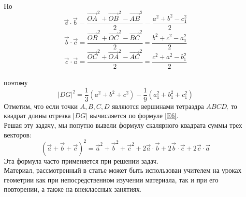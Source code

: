 \documentclass{article}
\begin{document}
\\Но
$$\overrightarrow{a}\cdot\overrightarrow{b}=\frac{\overrightarrow{OA}^2+\overrightarrow{OB}^2-\overrightarrow{AB}^2}{2}=\frac{a^2+b^2-c_1^2}{2}$$
$$\overrightarrow{b}\cdot\overrightarrow{c}=\frac{\overrightarrow{OB}^2+\overrightarrow{OC}^2-\overrightarrow{BC}^2}{2}=\frac{b^2+c^2-a_1^2}{2}$$
$$\overrightarrow{c}\cdot\overrightarrow{a}=\frac{\overrightarrow{OC}^2+\overrightarrow{OA}^2-\overrightarrow{AC}^2}{2}=\frac{c^2+a^2-b_1^2}{2}$$
\\поэтому
\begin{equation}\label{E6}
|DG|^2=\frac{1}{3}(a^2+b^2+c^2)-\frac{1}{9}(a_1^2+b_1^2+c_1^2)
\end{equation}
Отметим, что если точки $A,B,C,D$ являются вершинами тетраэдра $ABCD$, то квадрат длины отрезка $|DG|$ вычисляется по формуле \eqref{E6}.
\\Решая эту задачу, мы попутно вывели формулу скалярного квадрата суммы трех векторов:
$$(\overrightarrow{a}+\overrightarrow{b}+\overrightarrow{c})^2=\overrightarrow{a}^2+\overrightarrow{b}^2+\overrightarrow{c}^2+2\overrightarrow{a}\cdot\overrightarrow{b}+2\overrightarrow{b}\cdot\overrightarrow{c}+2\overrightarrow{c}\cdot\overrightarrow{a}$$
Эта формула часто применяется при решении задач.
\\Материал, рассмотренный в статье может быть использован учителем на уроках геометрии как при непосредственном изучении материала, так и при его повторении, а также на внеклассных занятиях.
\end{document}
